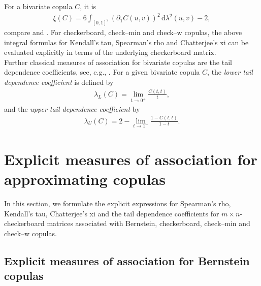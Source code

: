 \documentclass{article}
\theoremstyle{definition}
\newcommand{\de}{\mathrm{\,d}}
\begin{document}
For a bivariate copula $C$, it is
\begin{align}\label{eq:xi}
    \xi(C) = 6 \int_{[0,1]^2} \left(\partial_1 C(u,v)\right)^2 \de \lambda^2(u,v) - 2
,\end{align}
compare \cite{dette2013copula} and \cite{chatterjee2020}.
For checkerboard, check--min and check--w copulas, the above integral formulas for Kendall's tau, Spearman's rho and Chatterjee's xi can be evaluated explicitly in terms of the underlying checkerboard matrix. \\
Further classical measures of association for bivariate copulas are the tail dependence coefficients, see, e.g., \cite{Joe-1997,Nelsen-2006}.
For a given bivariate copula $C$, the \emph{lower tail dependence coefficient} is defined by
\begin{align}\label{eq:lower_tail_dependence_coefficient}
    \lambda_L(C)=\lim _{t \rightarrow 0^{+}} \frac{C(t, t)}{t}
,\end{align}
and the \emph{upper tail dependence coefficient} by
\begin{align}\label{eq:upper_tail_dependence_coefficient}
    \lambda_U(C) =2-\lim _{t \rightarrow 1^{-}} \frac{1-C(t, t)}{1-t}
.\end{align}

\section{Explicit measures of association for approximating copulas}
\label{sec:explicit_measures_of_association}

In this section, we formulate the explicit expressions for Spearman's rho, Kendall's tau, Chatterjee's xi and the tail dependence coefficients for $m\times n$-checkerboard matrices associated with Bernstein, checkerboard, check--min and check--w copulas.

\subsection{Explicit measures of association for Bernstein copulas}
\label{subsec:bernstein_copulas_measures_of_association}
\end{document}
